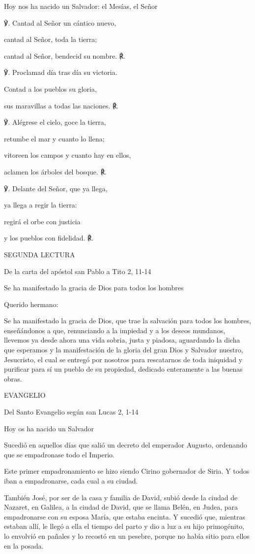 \documentclass[]{article}
\begin{document}
Hoy nos ha nacido un Salvador: el Mesías, el Señor

℣. Cantad al Señor un cántico nuevo,

cantad al Señor, toda la tierra;

cantad al Señor, bendecid su nombre. ℟.

℣. Proclamad día tras día su victoria.

Contad a los pueblos su gloria,

sus maravillas a todas las naciones. ℟.

℣. Alégrese el cielo, goce la tierra,

retumbe el mar y cuanto lo llena;

vitoreen los campos y cuanto hay en ellos,

aclamen los árboles del bosque. ℟.

℣. Delante del Señor, que ya llega,

ya llega a regir la tierra:

regirá el orbe con justicia

y los pueblos con fidelidad. ℟.

SEGUNDA LECTURA

De la carta del apóstol san Pablo a Tito 2, 11-14

Se ha manifestado la gracia de Dios para todos los hombres

Querido hermano:

Se ha manifestado la gracia de Dios, que trae la salvación para todos
los hombres, enseñándonos a que, renunciando a la impiedad y a los
deseos mundanos, llevemos ya desde ahora una vida sobria, justa y
piadosa, aguardando la dicha que esperamos y la manifestación de la
gloria del gran Dios y Salvador nuestro, Jesucristo, el cual se entregó
por nosotros para rescatarnos de toda iniquidad y purificar para sí un
pueblo de su propiedad, dedicado enteramente a las buenas obras.

EVANGELIO

Del Santo Evangelio según san Lucas 2, 1-14

Hoy os ha nacido un Salvador

Sucedió en aquellos días que salió un decreto del emperador Augusto,
ordenando que se empadronase todo el Imperio.

Este primer empadronamiento se hizo siendo Cirino gobernador de Siria. Y
todos iban a empadronarse, cada cual a su ciudad.

También José, por ser de la casa y familia de David, subió desde la
ciudad de Nazaret, en Galilea, a la ciudad de David, que se llama Belén,
en Judea, para empadronarse con su esposa María, que estaba encinta. Y
sucedió que, mientras estaban allí, le llegó a ella el tiempo del parto
y dio a luz a su hijo primogénito, lo envolvió en pañales y lo recostó
en un pesebre, porque no había sitio para ellos en la posada.
\end{document}
